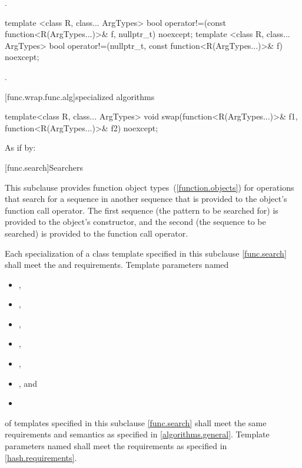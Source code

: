 \begin{itemdescr}
\pnum\returns {}.
\end{itemdescr}

%
\begin{itemdecl}
template <class R, class... ArgTypes>
  bool operator!=(const function<R(ArgTypes...)>& f, nullptr_t) noexcept;
template <class R, class... ArgTypes>
  bool operator!=(nullptr_t, const function<R(ArgTypes...)>& f) noexcept;
\end{itemdecl}

\begin{itemdescr}
\pnum\returns {}.
\end{itemdescr}

[func.wrap.func.alg]{specialized algorithms}

%
\begin{itemdecl}
template<class R, class... ArgTypes>
  void swap(function<R(ArgTypes...)>& f1, function<R(ArgTypes...)>& f2) noexcept;
\end{itemdecl}

\begin{itemdescr}
\pnum\effects As if by: 
\end{itemdescr}%

[func.search]{Searchers}

\pnum
This subclause provides function object types~(\ref{function.objects}) for
operations that search for a sequence  in another
sequence  that is provided to the object's function call
operator.  The first sequence (the pattern to be searched for) is provided to
the object's constructor, and the second (the sequence to be searched) is
provided to the function call operator.

\pnum
Each specialization of a class template specified in this subclause \ref{func.search} shall meet the  and  requirements.
Template parameters named
\begin{itemize}
\item {},
\item {},
\item {},
\item {},
\item {},
\item {}, and
\item {}
\end{itemize}
of templates specified in this subclause
\ref{func.search} shall meet the same requirements and semantics as
specified in \ref{algorithms.general}.
Template parameters named  shall meet the requirements as specified in \ref{hash.requirements}.

